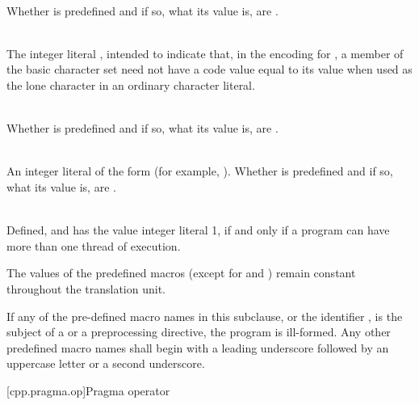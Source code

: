 \begin{description}
\item
{}%
\\
Whether  is predefined and if so, what its value is,
are .

\item
{}%
\\
The integer literal , intended to indicate that, in the encoding for
, a member of the basic character set need not have a code value equal to
its value when used as the lone character in an ordinary character literal.

\item
{}%
\\
Whether  is predefined and if so, what its value is,
are .

\item
{}%
\\
An integer literal of the form 
(for example, ).
Whether  is predefined and
if so, what its value is,
are .

\item
{}%
\\
Defined, and has the value integer literal 1, if and only if a program
can have more than one thread of execution.

\end{description}

\pnum
The values of the predefined macros
(except for
and
)
remain constant throughout the translation unit.

\pnum
If any of the pre-defined macro names in this subclause,
or the identifier
,
is the subject of a
or a
preprocessing directive,
the program is ill-formed.
Any other predefined macro names shall begin with a
leading underscore followed by an uppercase letter or a second
underscore.

[cpp.pragma.op]{Pragma operator}%
%


